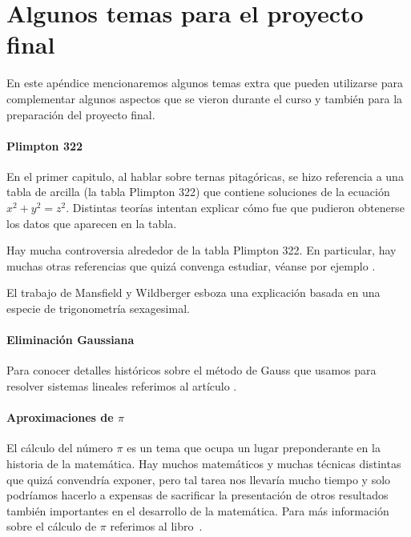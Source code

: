 \chapter{Algunos temas para el proyecto final}

\pagestyle{plain}
\fancyhf{}
\fancyfoot[CE,CO]{\leftmark}
\fancyfoot[LE,RO]{\thepage}


En este apéndice mencionaremos algunos temas extra 
que pueden utilizarse para complementar algunos aspectos que se
vieron durante el curso y también para la preparación
del proyecto final. 

\subsubsection*{Plimpton 322}

En el primer capitulo, al hablar sobre ternas pitagóricas, se hizo 
referencia a una tabla de arcilla (la tabla Plimpton 322) que contiene soluciones
de la ecuación $x^2+y^2=z^2$. Distintas teorías intentan explicar cómo
fue que pudieron obtenerse los datos que aparecen en la tabla. 

Hay mucha controversia alrededor de la tabla Plimpton 322. En particular, 
hay muchas otras referencias que quizá convenga estudiar, véanse por ejemplo 
\cite{MR1917126,MR631810,MR3074274,MR1849797,MR1903149,MR3955330}.

El trabajo
\cite{MR3716328} 
de Mansfield y Wildberger esboza una explicación basada en una especie 
de trigonometría sexagesimal. 

\subsubsection*{Eliminación Gaussiana}

Para conocer detalles históricos sobre 
el método de Gauss que usamos para resolver sistemas lineales
referimos al artículo \cite{MR2775854}. 

\subsubsection*{Aproximaciones de $\pi$}

El cálculo del número $\pi$ es un tema que ocupa un lugar preponderante en la
historia de la matemática. Hay muchos matemáticos y muchas técnicas distintas
que quizá convendría exponer, pero tal tarea nos llevaría mucho tiempo y solo
podríamos hacerlo a expensas de sacrificar la presentación de otros resultados
también importantes en el desarrollo de la matemática. Para más información
sobre el cálculo de $\pi$ referimos al libro~\cite{MR0449960}. 

